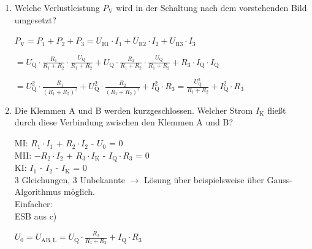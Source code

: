 {\begin {enumerate}[label=\alph*)]
        $U_0 = U_\mathrm{AB,L} =  U_\mathrm{Q} \cdot \frac{R_2}{R_1+R_2} + I_\mathrm{Q} \cdot R_3$\\

        $ R_\mathrm{i} = R_\mathrm{i,AB}= R_3 + \frac{R_1 \cdot R_2}{R_1 + R_2}$

        

        \item Welche Verlustleistung $P_{\mathrm{V}}$ wird in der Schaltung nach dem vorstehenden Bild umgesetzt?
        
        $P_\mathrm{V} = P_1 + P_2 + P_3 = U_\mathrm{R1} \cdot I_1 + U_\mathrm{R2} \cdot I_2 + U_\mathrm{R3} \cdot I_3$\

        $= U_\mathrm{Q} \cdot \frac{R_1}{R_1+R_2} \cdot \frac{U_\mathrm{Q}}{R_1+R_2} +U_\mathrm{Q} \cdot \frac{R_2}{R_1+R_2} \cdot \frac{U_\mathrm{Q}}{R_1+R_2} + R_3 \cdot I_\mathrm{Q} \cdot I_\mathrm{Q} $

        $= U_\mathrm{Q}^2 \cdot \frac{R_1}{(R_1+R_2)^2} + U_\mathrm{Q}^2 \cdot \frac{R_2}{(R_1+R_2)^2} + I_\mathrm{Q}^2 \cdot R_3 = \frac{U_\mathrm{Q}^2}{R_1+R_2} +I_\mathrm{Q}^2 \cdot R_3 $


        \item Die Klemmen A und B werden kurzgeschlossen. Welcher Strom $I_{\mathrm{K}}$ fließt durch diese Verbindung
        zwischen den Klemmen A und B?

                \begin{center}
            
        \end{center}

        MI: $R_1 \cdot I_1$ + $R_2 \cdot I_2$             - $U_0$ = 0\\
        MII: $- R_2 \cdot I_2 $ + $R_3 \cdot I_\mathrm{K}$      - $I_\mathrm{Q} \cdot R_3$ = 0\\
        KI: $I_1$ - $I_2$ - $I_\mathrm{K}$ = 0\\

        3 Gleichungen, 3 Unbekannte $\rightarrow$ Lösung über beispielsweise über Gauss-Algorithmus möglich.\\

        Einfacher:\\
        ESB aus c) 

        \begin{center}
            
        \end{center}

        $U_0 = U_\mathrm{AB,L} =  U_\mathrm{Q} \cdot \frac{R_2}{R_1+R_2} + I_\mathrm{Q} \cdot R_3$\\


\end{enumerate}}
